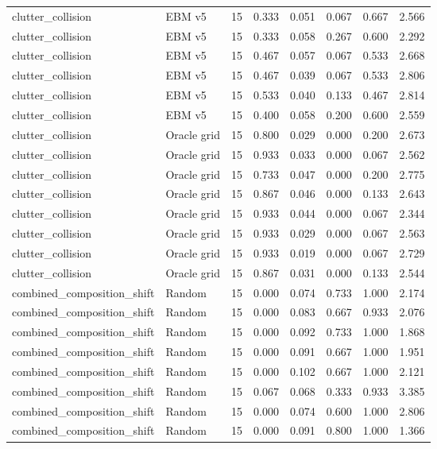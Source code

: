 {\begin{longtable}{llrrrrrr}
clutter\_collision & EBM v5 & 15 & 0.333 & 0.051 & 0.067 & 0.667 & 2.566 \\
clutter\_collision & EBM v5 & 15 & 0.333 & 0.058 & 0.267 & 0.600 & 2.292 \\
clutter\_collision & EBM v5 & 15 & 0.467 & 0.057 & 0.067 & 0.533 & 2.668 \\
clutter\_collision & EBM v5 & 15 & 0.467 & 0.039 & 0.067 & 0.533 & 2.806 \\
clutter\_collision & EBM v5 & 15 & 0.533 & 0.040 & 0.133 & 0.467 & 2.814 \\
clutter\_collision & EBM v5 & 15 & 0.400 & 0.058 & 0.200 & 0.600 & 2.559 \\
clutter\_collision & Oracle grid & 15 & 0.800 & 0.029 & 0.000 & 0.200 & 2.673 \\
clutter\_collision & Oracle grid & 15 & 0.933 & 0.033 & 0.000 & 0.067 & 2.562 \\
clutter\_collision & Oracle grid & 15 & 0.733 & 0.047 & 0.000 & 0.200 & 2.775 \\
clutter\_collision & Oracle grid & 15 & 0.867 & 0.046 & 0.000 & 0.133 & 2.643 \\
clutter\_collision & Oracle grid & 15 & 0.933 & 0.044 & 0.000 & 0.067 & 2.344 \\
clutter\_collision & Oracle grid & 15 & 0.933 & 0.029 & 0.000 & 0.067 & 2.563 \\
clutter\_collision & Oracle grid & 15 & 0.933 & 0.019 & 0.000 & 0.067 & 2.729 \\
clutter\_collision & Oracle grid & 15 & 0.867 & 0.031 & 0.000 & 0.133 & 2.544 \\
combined\_composition\_shift & Random & 15 & 0.000 & 0.074 & 0.733 & 1.000 & 2.174 \\
combined\_composition\_shift & Random & 15 & 0.000 & 0.083 & 0.667 & 0.933 & 2.076 \\
combined\_composition\_shift & Random & 15 & 0.000 & 0.092 & 0.733 & 1.000 & 1.868 \\
combined\_composition\_shift & Random & 15 & 0.000 & 0.091 & 0.667 & 1.000 & 1.951 \\
combined\_composition\_shift & Random & 15 & 0.000 & 0.102 & 0.667 & 1.000 & 2.121 \\
combined\_composition\_shift & Random & 15 & 0.067 & 0.068 & 0.333 & 0.933 & 3.385 \\
combined\_composition\_shift & Random & 15 & 0.000 & 0.074 & 0.600 & 1.000 & 2.806 \\
combined\_composition\_shift & Random & 15 & 0.000 & 0.091 & 0.800 & 1.000 & 1.366 \\

\end{longtable}}
